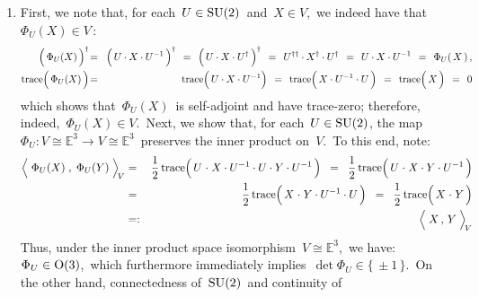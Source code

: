 \begin{enumerate}
\item
	First, we note that, for each \,$U \in \textnormal{SU}(2)$\, and \,$X \in V$,\,
	we indeed have that \,$\Phi_{U}(X) \in V$\,:
	\begin{eqnarray*}
	\left(\,\Phi_{U}(\overset{{\color{white}.}}{X})\,\right)^{\dagger}
	& \!=\! &
		\left(\, U \cdot \overset{{\color{white}.}}{X} \cdot U^{-1} \,\right)^{\dagger}
	\;\, = \;\,
		\left(\, U \cdot \overset{{\color{white}.}}{X} \cdot U^{\dagger} \,\right)^{\dagger}
	\;\, = \;\,
		U^{\dagger\dagger} \cdot X^{\dagger} \cdot U^{\dagger}
	\;\, = \;\,
		U \cdot X \cdot U^{-1}
	\;\, = \;\,
		\Phi_{U}(\,X\,)\,,
	\\
	\trace\!\left(\,\Phi_{U}(\overset{{\color{white}.}}{X})\,\right)
	& \!=\! &
		\trace\!\left(\, U \cdot \overset{{\color{white}.}}{X} \cdot U^{-1}\right)
	\;\, = \;\,
		\trace\!\left(\, \overset{{\color{white}.}}{X} \cdot U^{-1} \cdot U \,\right)
	\;\, = \;\,
		\trace\!\left(\, \overset{{\color{white}.}}{X} \,\right)
	\;\, = \;\,
		0
	\end{eqnarray*}
	which shows that \,$\Phi_{U}(X)$\, is self-adjoint and have trace-zero;
	therefore, indeed, \,$\Phi_{U}(X) \in V$.\,
	Next, we show that, for each \,$U \in \textnormal{SU}(2)$, the map
	\,$\Phi_{U} : V \cong \mathbb{E}^{3}\longrightarrow V \cong \mathbb{E}^{3}$\,
	preserves the inner product on \,$V$.\,
	To this end, note:
	\begin{eqnarray*}
		\left\langle\;
		\Phi_{U}(\overset{{\color{white}.}}{X})
		\; , \;
		\Phi_{U}(Y)
		\;\right\rangle_{\!V}
	& = &
		\dfrac{1}{2}\,
		\trace\!\left(\,
				U \overset{{\color{white}1}}{\cdot} X \cdot U^{-1} \cdot U \cdot Y \cdot U^{-1}
			\,\right)
	\;\; = \;\;
		\dfrac{1}{2}\,
		\trace\!\left(\,
			U \overset{{\color{white}1}}{\cdot} X \cdot Y \cdot U^{-1}
			\,\right)
	\\
	& = &
		\dfrac{1}{2}\,
		\trace\!\left(\,
			X \overset{{\color{white}1}}{\cdot} Y \cdot U^{-1} \cdot U
			\,\right)
	\;\; = \;\;
		\dfrac{1}{2}\,
		\trace\!\left(\,
			X \overset{{\color{white}1}}{\cdot} Y
			\,\right)
	\\
	& =: &
		\left\langle\;
			\overset{{\color{white}.}}{X}
			\, , \,
			Y
			\;\right\rangle_{\!V}
	\end{eqnarray*}
	Thus, under the inner product space isomorphism
	\,$V \cong \mathbb{E}^{3}$,\,
	we have:
	\,$\Phi_{U} \in \textnormal{O}(3)$,\,
	which furthermore immediately implies
	\,$\det\Phi_{U} \in \{\,\pm 1\,\}$.\,
	On the other hand, connectedness of \,$\textnormal{SU}(2)$\, and continuity of

\end{enumerate}
